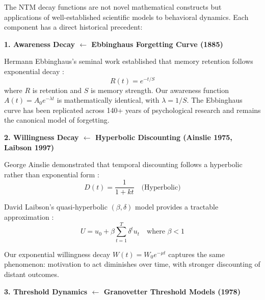 \documentclass[11pt, a4paper]{article}
\begin{document}
\begin{tcolorbox}[colback=blue!5!white, colframe=blue!75!black,
    title=\textbf{Scientific Foundations: NTM in Historical Context}]

The NTM decay functions are not novel mathematical constructs but applications of well-established scientific models to behavioral dynamics. Each component has a direct historical precedent:

\vspace{0.5em}
\textbf{1. Awareness Decay $\leftarrow$ Ebbinghaus Forgetting Curve (1885)}

Hermann Ebbinghaus's seminal work established that memory retention follows exponential decay \citep{ebbinghaus1885memory}:
\begin{equation}
R(t) = e^{-t/S}
\end{equation}
where $R$ is retention and $S$ is memory strength. Our awareness function $A(t) = A_0 e^{-\lambda t}$ is mathematically identical, with $\lambda = 1/S$. The Ebbinghaus curve has been replicated across 140+ years of psychological research and remains the canonical model of forgetting.

\vspace{0.5em}
\textbf{2. Willingness Decay $\leftarrow$ Hyperbolic Discounting (Ainslie 1975, Laibson 1997)}

George Ainslie demonstrated that temporal discounting follows a hyperbolic rather than exponential form \citep{PAP-ainslie1975specious}:
\begin{equation}
D(t) = \frac{1}{1 + kt} \quad \text{(Hyperbolic)}
\end{equation}

David Laibson's quasi-hyperbolic $(\beta, \delta)$ model provides a tractable approximation \citep{laibson1997golden}:
\begin{equation}
U = u_0 + \beta \sum_{t=1}^{T} \delta^t u_t \quad \text{where } \beta < 1
\end{equation}

Our exponential willingness decay $W(t) = W_0 e^{-\mu t}$ captures the same phenomenon: motivation to act diminishes over time, with stronger discounting of distant outcomes.

\vspace{0.5em}
\textbf{3. Threshold Dynamics $\leftarrow$ Granovetter Threshold Models (1978)}


\end{tcolorbox}
\end{document}
